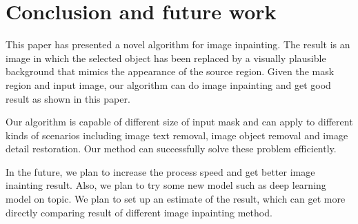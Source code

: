 \section{Conclusion and future work}
This paper has presented a novel algorithm for image inpainting. The result is an image in
which the selected object has been replaced by a visually plausible background that mimics the appearance of the source region. Given the mask region and input image, our algorithm can do image inpainting and get good result as shown in this paper. 

Our algorithm is capable of different size of input mask and can apply to different kinds of scenarios including image text removal, image object removal and image detail restoration. Our method can successfully solve these problem efficiently.

In the future, we plan to increase the process speed and get better image inainting result. Also, we plan to try some new model such as deep learning model on topic. We plan to set up an estimate of the result, which can get more directly comparing result of different image inpainting method.
